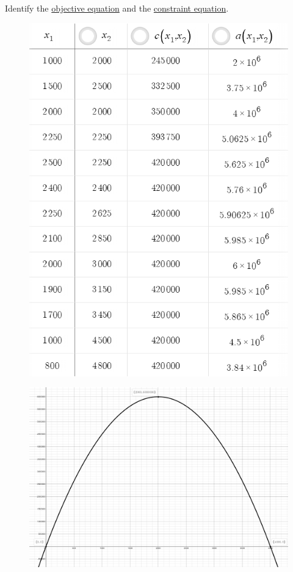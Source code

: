 \noindent Identify the \underline{objective equation} and the \underline{constraint equation}.
\begin{multicols}{2}
    \begin{minipage}{0.4\textwidth}
        \begin{figure}[H]
		\flushleft
		\includegraphics[scale=0.65]{images/appliedOptimization/Optimization_fencing1_ex10_4.PNG}
		\end{figure}
    \end{minipage}
    \begin{minipage}{0.6\textwidth}
    \vfill
		\begin{figure}[H]
		\centering
		\includegraphics[scale=0.15]{images/appliedOptimization/Optimization_fencing2_ex10_4.PNG}

\end{figure}
\end{minipage}
\end{multicols}
